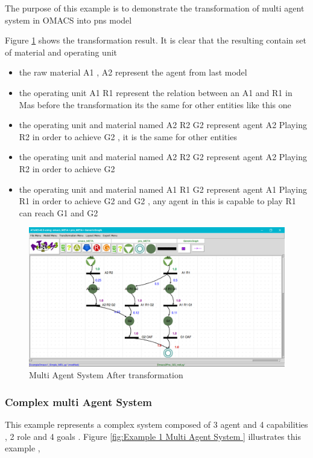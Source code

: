 The purpose of this example is to demonstrate the transformation of multi agent system in OMACS into pns model

Figure \ref{fig:Multi Agent System After transformation } shows the transformation result.
It is clear that the resulting contain set of material and operating unit
 
\begin{itemize}
\item the raw material A1 , A2 represent the agent from last model
\item the operating unit A1 R1 represent the relation between an A1 and R1 
in Mas before the transformation its the same for other entities like this one
\item the operating unit and material named A2 R2 G2 represent agent A2 Playing R2 in order to achieve G2 , it is the same for other entities  

\item the operating unit and material named A2 R2 G2 represent agent A2 Playing R2 in order to achieve G2 


\item the operating unit and material named A1 R1 G2 represent agent A1 Playing R1 in order to achieve G2  and G2 , any agent in this is capable to play R1 can reach G1 and G2
 

\end{itemize}
  


\begin{figure}[th]
	\centering
 	\includegraphics[scale=0.3]{Chapiter3/img/ex1pns}
	\caption{\label{fig:Multi Agent System After transformation }Multi Agent System After transformation}
\end{figure}  
\subsubsection{ Complex multi Agent System }
This example represents a complex system composed of  3 agent and 4 capabilities , 2 role and 4 goals  . Figure \ref{fig:Example 1 Multi Agent System } illustrates this example ,
 


